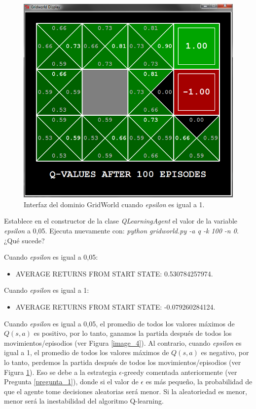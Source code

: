 \documentclass[11pt]{exam}
\begin{document}
\begin{questions}
\begin{figure}[h]
	\centering
	\includegraphics[scale=0.5]{image_3}
	\caption{Interfaz del dominio GridWorld cuando \textit{epsilon} es igual a 1.}
	\label{image_3}
\end{figure}

{ \question Establece en el constructor de la clase \textit{QLearningAgent} el valor de la variable \textit{epsilon} a 0,05. Ejecuta nuevamente con: \textit{python gridworld.py -a q -k 100 -n 0}. ¿Qué sucede?
}

Cuando \textit{epsilon} es igual a 0,05:
\begin{itemize}
	\item AVERAGE RETURNS FROM START STATE: 0.530784257974.
\end{itemize}

Cuando \textit{epsilon} es igual a 1:
\begin{itemize}
	\item AVERAGE RETURNS FROM START STATE: -0.079260284124.
\end{itemize}

Cuando \textit{epsilon} es igual a 0,05, el promedio de todos los valores máximos de $Q(s,a)$ es positivo, por lo tanto, ganamos la partida después de todos los movimientos/episodios (ver Figura \ref{image_4}). Al contrario, cuando \textit{epsilon} es igual a 1, el promedio de todos los valores máximos de $Q(s,a)$ es negativo, por lo tanto, perdemos la partida después de todos los movimientos/episodios (ver Figura \ref{image_3}). Eso se debe a la estrategia $\epsilon$-greedy comentada anteriormente (ver Pregunta \ref{pregunta_1}), donde si el valor de $\epsilon$ es más pequeño, la probabilidad de que el agente tome decisiones aleatorias será menor. Si la aleatoriedad es menor, menor será la inestabilidad del algoritmo Q-learning.


\end{questions}
\end{document}

